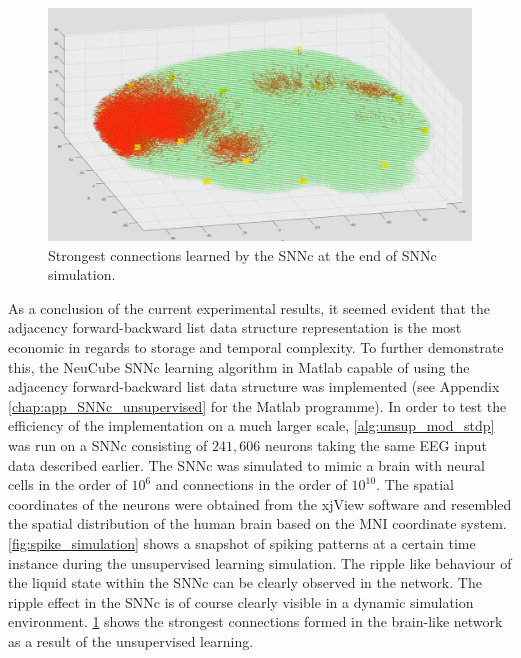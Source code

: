 \begin{figure}
	\centering
	\includegraphics[width=0.8\linewidth]{fig/largesnn/connection_simulation.png}
	\caption{Strongest connections learned by the SNNc at the end of SNNc simulation.}
	\label{fig:connection_simulation}
\end{figure}

As a conclusion of the current experimental results, it seemed evident that the adjacency forward-backward list data structure representation is the most economic in regards to storage and temporal complexity. To further demonstrate this, the NeuCube SNNc learning algorithm in Matlab capable of using the adjacency forward-backward list data structure was implemented (see Appendix \ref{chap:app_SNNc_unsupervised} for the Matlab programme). In order to test the efficiency of the implementation on a much larger scale, \algorithmname \ref{alg:unsup_mod_stdp} was run on a SNNc consisting of $241,606$ neurons taking the same EEG input data described earlier. The SNNc was simulated to mimic a brain with neural cells in the order of $10^6$ and connections in the order of $10^{10}$. The spatial coordinates of the neurons were obtained from the xjView \citep{cui2011xjview} software and resembled the spatial distribution of the human brain based on the MNI coordinate system. \figurename \ref{fig:spike_simulation} shows a snapshot of spiking patterns at a certain time instance during the unsupervised learning simulation. The ripple like behaviour of the liquid state within the SNNc can be clearly observed in the network. The ripple effect in the SNNc is of course clearly visible in a dynamic simulation environment. \figurename \ref{fig:connection_simulation} shows the strongest connections formed in the brain-like network as a result of the unsupervised learning.

